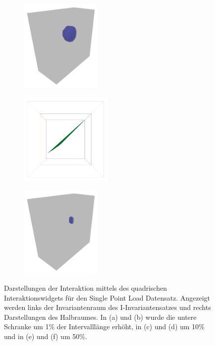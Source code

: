 \documentclass[a4paper,fontsize=12pt,toc=bib,halfparskip,ngerman]{scrartcl}
\begin{document}
\begin{figure}
\begin{subfigure}{0.49\textwidth}
		\subcaption{}
		\label{SinglePointInvariant2}
	\end{subfigure}
	\hspace*{\fill}
	\begin{subfigure}{0.49\textwidth}
		\centering
		\includegraphics[height=4.5cm]{pictures/results/SinglePoint/SinglePoint_Object2.png}
		\subcaption{}
		\label{SinglePointObject2}
	\end{subfigure}
	\medskip
	\begin{subfigure}{0.49\textwidth}
		\centering
		\includegraphics[height=4.5cm]{pictures/results/SinglePoint/SinglePoint_InvariantSpace3.png}
		\subcaption{}
		\label{SinglePointInvariant3}
	\end{subfigure}
	\hspace*{\fill}
	\begin{subfigure}{0.49\textwidth}
		\centering
		\includegraphics[height=4.5cm]{pictures/results/SinglePoint/SinglePoint_Object3.png}
		\subcaption{}
		\label{SinglePointObject3}
	\end{subfigure}
	\caption{Darstellungen der Interaktion mittels des quadrischen Interaktionswidgets f\"ur den Single Point Load Datensatz. Angezeigt werden links der Invariantenraum des I-Invariantensatzes und rechts Darstellungen des Halbraumes. In (a) und (b) wurde die untere Schranke um 1\% der Intervalll\"ange erh\"oht, in (c) und (d) um 10\% und in (e) und (f) um 50\%.}
	\label{SinglePointInteraction}
\end{figure}
\end{document}
